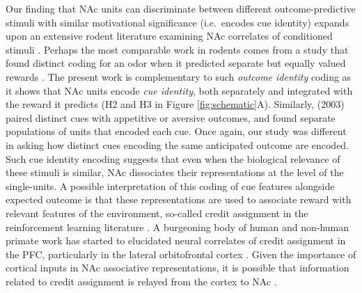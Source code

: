 \documentclass[11pt]{article}
\let\cite=\citep
\begin{document}
Our finding that NAc units can discriminate between different
outcome-predictive stimuli with similar motivational significance
(i.e.\ encodes cue identity) expands upon an extensive rodent
literature examining NAc correlates of conditioned stimuli
\cite{Setlow2003,Nicola2004,Yun2004,Roitman2005,Day2006,Ambroggi2008,Ishikawa2008,Roesch2009a,Saddoris2011,Goldstein2012,Lansink2012,Bissonette2013,McGinty2013,Atallah2014,Sugam2014,Cooch2015,West2016,Dejean2017}. Perhaps
the most comparable work in rodents comes from a study that found
distinct coding for an odor when it predicted separate but equally
valued rewards \cite{Cooch2015}. The present work is complementary to
such {\it outcome identity} coding as it shows that NAc units encode {\it cue
  identity}, both separately and integrated with the reward it
predicts (H2 and H3 in Figure \ref{fig:schematic}A). Similarly,
\citeauthor{Setlow2003} (2003) paired distinct cues with appetitive or aversive
outcomes, and found separate populations of units that encoded each
cue. Once again, our study was different in asking how distinct cues
encoding the same anticipated outcome are encoded. Such cue identity
encoding suggests that even when the biological relevance of these
stimuli is similar, NAc dissociates their representations at the level
of the single-units. A possible interpretation of this coding of cue
features alongside expected outcome is that these representations are
used to associate reward with relevant features of the environment,
so-called credit assignment in the reinforcement learning literature
\cite{sutton1998}. A burgeoning body of human and non-human primate
work has started to elucidated neural correlates of credit assignment
in the PFC, particularly in the lateral orbitofrontal cortex
\cite{Chau2015,Akaishi2016,Asaad2017,Noonan2017}. Given the importance
of cortical inputs in NAc associative representations, it is possible
that information related to credit assignment is relayed from the
cortex to NAc \cite{Ishikawa2008,Cooch2015}.
\end{document}
